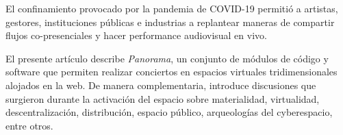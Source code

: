 

El confinamiento provocado por la pandemia de COVID-19 permitió a artistas, gestores, instituciones públicas e industrias a replantear maneras de compartir flujos co-presenciales y hacer performance audiovisual en vivo. %

El presente artículo describe \textit{Panorama}, un conjunto de módulos de código y software que permiten realizar conciertos en espacios virtuales tridimensionales alojados en la web. De manera complementaria, introduce discusiones que surgieron durante la activación del espacio sobre materialidad, virtualidad, descentralización, distribución, espacio público, arqueologías del cyberespacio, entre otros.                       

